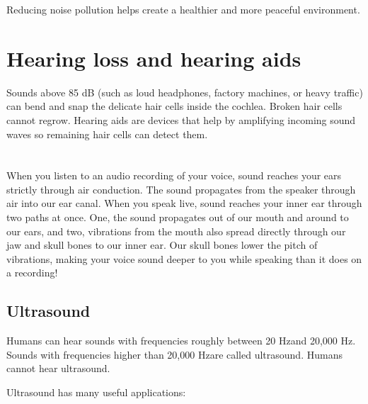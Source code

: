 \documentclass{xtufte-handout}
\newcommand{\hertz}{Hz}
\begin{document}
Reducing noise pollution helps create a healthier and more peaceful environment.

\section{Hearing loss and hearing aids}
Sounds above 85 dB (such as loud headphones, factory machines, or heavy traffic) can bend and snap the delicate hair cells inside the cochlea. Broken hair cells cannot regrow. Hearing aids are devices that help by amplifying incoming sound waves so remaining hair cells can detect them.
\begin{marginfigure}
  \caption{Image of hearing aid}
\end{marginfigure}

\section{}
When you listen to an audio recording of your voice, sound reaches your ears strictly through air conduction. The sound propagates from the speaker through air into our ear canal. When you speak live, sound reaches your inner ear through two paths at once. One, the sound propagates out of our mouth and around to our ears, and two, vibrations from the mouth also spread directly through our jaw and skull bones to our inner ear. Our skull bones lower the pitch of vibrations, making your voice sound deeper to you while speaking than it does on a recording!


\subsection{Ultrasound}
Humans can hear sounds with frequencies roughly between 20 \hertz and 20,000 \hertz. Sounds with frequencies higher than 20,000 \hertz are called ultrasound. Humans cannot hear ultrasound.

Ultrasound has many useful applications:
\end{document}

